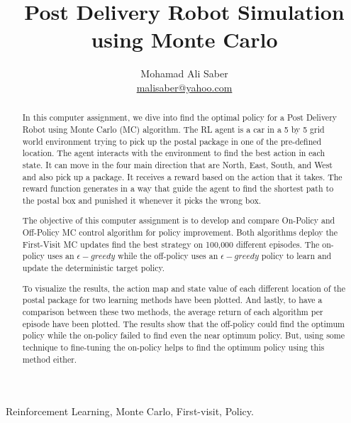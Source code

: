 \documentclass[lettersize,journal]{IEEEtran}
\begin{document}
\title{Post Delivery Robot Simulation using Monte Carlo}

\author{Mohamad Ali Saber \\ \href{mailto:malisaber@yahoo.com}{malisaber@yahoo.com}}
\maketitle

\begin{abstract}
In this computer assignment, we dive into find the optimal policy for a Post Delivery Robot using Monte Carlo (MC) algorithm. The RL agent is a car in a 5 by 5 grid world environment trying to pick up the postal package in one of the pre-defined location. The agent interacts with the environment to find the best action in each state. It can move in the four main direction that are North, East, South, and West and also pick up a package. It receives a reward based on the action that it takes. The reward function generates in a way that guide the agent to find the shortest path to the postal box and punished it whenever it picks the wrong box.\par

The objective of this computer assignment is to develop and compare On-Policy and Off-Policy MC control algorithm for policy improvement. Both algorithms deploy the First-Visit MC updates find the best strategy on 100,000 different episodes. The on-policy uses an $\epsilon-greedy$ while the off-policy uses an $\epsilon-greedy$ policy to learn and update the deterministic target policy.\par

To visualize the results, the action map and state value of each different location of the postal package for two learning methods have been plotted. And lastly, to have a comparison between these two methods, the average return of each algorithm per episode have been plotted. The results show that the off-policy could find the optimum policy while the on-policy failed to find even the near optimum policy. But, using some technique to fine-tuning the on-policy helps to find the optimum policy using this method either.
\end{abstract}

\begin{IEEEkeywords}
Reinforcement Learning, Monte Carlo, First-visit, Policy.
\end{IEEEkeywords}




\end{document}
